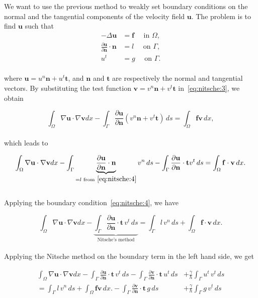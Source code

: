 \documentclass[11pt,a4paper,titlepage]{report}
\begin{document}
We want to use the previous method to weakly set boundary conditions on the normal and the tangential components of the velocity field $\mathbf{u}$. The problem is to find $\mathbf{u}$ such that
\begin{align}
- \Delta \mathbf{u} &= \mathbf{f} \quad \text{ in } \Omega, \\
\label{eq:nitsche:4}
\frac{\partial \mathbf{u}}{\partial \mathbf{n}} \cdot \mathbf{n} &= l \quad \text{ on } \Gamma, \\ 
u^t &= g \quad \text{ on } \Gamma.
\end{align}
\\
where $\mathbf{u} = u^n \mathbf{n} + u^t \mathbf{t}$, and $\mathbf{n}$ and $\mathbf{t}$ are respectively the normal and tangential vectors. By substituting the test function $\mathbf{v} = v^n \mathbf{n} + v^t \mathbf{t}$ in~\eqref{eq:nitsche:3}, we obtain

\begin{equation}
\int_\Omega \nabla \mathbf{u} \cdot \nabla \mathbf{v} dx
- \int_{\Gamma} \frac{\partial \mathbf{u}}{\partial \mathbf{n}} (v^n \mathbf{n} + v^t \mathbf{t} ) \, ds
 = \int_\Omega \mathbf{fv} \, dx,
\end{equation}
\\
which leads to

\begin{equation}
\int_\Omega \nabla \mathbf{u} \cdot \nabla \mathbf{v} dx
- \int_{\Gamma}  \underbrace{ \frac{\partial \mathbf{u}}{\partial \mathbf{n}} \cdot \mathbf{n} }_{= l \text{ from} ~\eqref{eq:nitsche:4} }  v^n \, ds
- \int_{\Gamma} \frac{\partial \mathbf{u}}{\partial \mathbf{n}} \cdot \mathbf{t} v^t \, ds
= \int_\Omega \mathbf{f \cdot v} \, dx.
\end{equation}
\\
Applying the boundary condition~\eqref{eq:nitsche:4}, we have

\begin{equation}
\int_\Omega \nabla \mathbf{u} \cdot \nabla \mathbf{v} dx
-  \underbrace{ \int_{\Gamma} \frac{\partial \mathbf{u}}{\partial \mathbf{n}} \cdot \mathbf{t} \, v^t \, ds }_\text{Nitsche's method}
=  \int_{\Gamma} l \, v^n \, ds 
+ \int_\Omega \mathbf{f \cdot v} \, dx.
\end{equation}
\\
Applying the Nitsche method on the boundary term in the left hand side, we get

\begin{equation}
\begin{split}
\int_\Omega \nabla \mathbf{u} \cdot \nabla \mathbf{v} dx
- \int_{\Gamma} \frac{\partial \mathbf{u}}{\partial \mathbf{n}} \cdot \mathbf{t} \, v^t \, ds 
- \int_{\Gamma} \frac{\partial \mathbf{v}}{\partial \mathbf{n}} \cdot \mathbf{t} \, u^t \, ds
&+ \frac{\gamma}{h} \int_{\Gamma} u^t \, v^t \, ds \\
=  \int_{\Gamma} l \, v^n \, ds
+ \int_\Omega \mathbf{fv} \, dx.
- \int_{\Gamma} \frac{\partial \mathbf{v}}{\partial \mathbf{n}} \cdot \mathbf{t} \, g \, ds
&+ \frac{\gamma}{h} \int_{\Gamma} g \, v^t \, ds
\end{split}
\end{equation}
\end{document}
